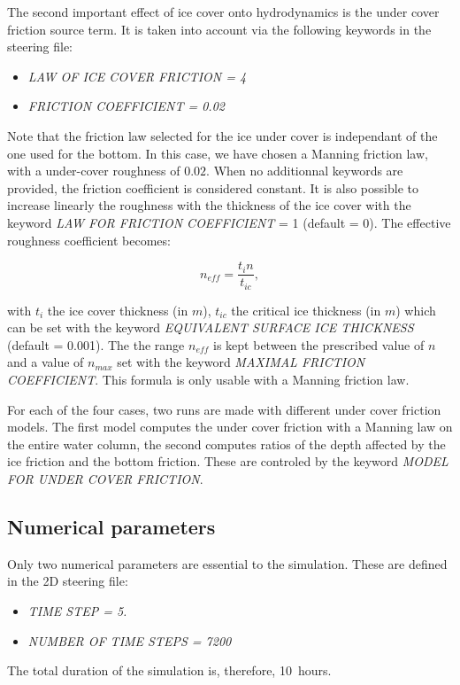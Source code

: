 The second important effect of ice cover onto hydrodynamics is the under cover friction source term.
It is taken into account via the following keywords in the \khione steering file:
\begin{itemize}
    \item\textit{LAW OF ICE COVER FRICTION = 4}
    \item\textit{FRICTION COEFFICIENT = 0.02}
\end{itemize}
Note that the friction law selected for the ice under cover is independant of the one used for the bottom.
In this case, we have chosen a Manning friction law, with a under-cover roughness of $0.02$.
When no additionnal keywords are provided, the friction coefficient is considered constant.
It is also possible to increase linearly the roughness with the thickness of the ice cover with the keyword \textit{LAW FOR FRICTION COEFFICIENT} = 1 (default = 0). The effective roughness coefficient becomes:

\begin{equation}
 n_{eff}=\frac{t_i n}{t_{ic}},
\end{equation}

with $t_i$ the ice cover thickness (in $m$), $t_{ic}$ the critical ice thickness (in $m$) which can be set with the keyword \textit{EQUIVALENT SURFACE ICE THICKNESS} (default = 0.001). The the range $n_{eff}$ is kept between the prescribed value of $n$ and a value of $n_{max}$ set with the keyword \textit{MAXIMAL FRICTION COEFFICIENT}. This formula is only usable with a Manning friction law.

For each of the four cases, two runs are made with different under cover friction models. The first model computes the under cover friction with a Manning law on the entire water column, the second computes ratios of the depth affected by the ice friction and the bottom friction. These are controled by the keyword \textit{MODEL FOR UNDER COVER FRICTION}.

\subsection{Numerical parameters}
Only two numerical parameters are essential to the simulation. These are defined in the \telemac2D steering file:
\begin{itemize}
    \item\textit{TIME STEP = 5.}
    \item\textit{NUMBER OF TIME STEPS = 7200}
\end{itemize}
The total duration of the simulation is, therefore, 10~hours.

